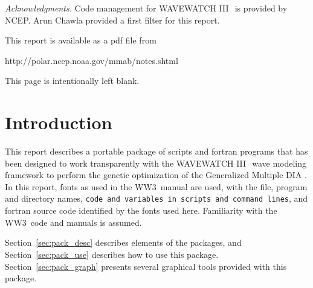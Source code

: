 \documentclass[12pt]{article}
\newcommand{\pstyle}{plain}
\newcommand{\wwt}{WAVEWATCH III$\:$\textsuperscript\textregistered}
\newcommand{\ws}{WW3}
\newcommand{\gmd}{GMD}
\newcommand{\file}{\sf}
\newcommand{\code}{\tt}
\newcommand{\F}{\sc}
\newcommand{\pb}{\strut \vfill \pagebreak}
\newcommand{\bpagea}{\strut

\vspace{2.5in} \centerline{This page is intentionally left blank.}}
\newcommand{\newsec}{\setcounter{equation}{0}
                      \setcounter{myfigno}{0}
                      \setcounter{mytabno}{0}}
\newcounter{myfigno}[section]
\newcounter{mytabno}[section]
\begin{document}


{\it Acknowledgments.} Code management for \wwt\ is provided by NCEP. Arun
Chawla provided a first filter for this report.

\vspace{\baselineskip} \noindent
This report is available as a pdf file from

\vspace{\baselineskip}
\centerline{http://polar.ncep.noaa.gov/mmab/notes.shtml}


\vfill \pagebreak

\tableofcontents

\pb
\pagestyle{empty}

\bpagea


\pb
\pagestyle{\pstyle}
\section{Introduction} \label{sec:intro}
\newsec

\noindent
This report describes a portable package of scripts and {\F fortran} programs
that has been designed to work transparently with the \wwt\ wave modeling
framework \citep[model henceforth denoted as \ws]{tol:MMAB09a} to perform the
genetic optimization \citep[e.g.,][]{bk:ES03} of the Generalized Multiple DIA
\citep[\gmd,][]{tol:MMAB10d, tol:OMODgmd1, tol:OMODgmd2}.  In this report,
fonts as used in the \ws\ manual are used, with the {\file file, program and
directory names}, {\code code and variables in scripts and command lines}, and
{\F fortran} source code identified by the fonts used here. Familiarity with
the \ws\ code and manuals is assumed.

Section~\ref{sec:pack_desc} describes elements of the packages, and
Section~\ref{sec:pack_use} describes how to use this package.
Section~\ref{sec:pack_graph} presents several graphical tools provided with
this package.
\end{document}
